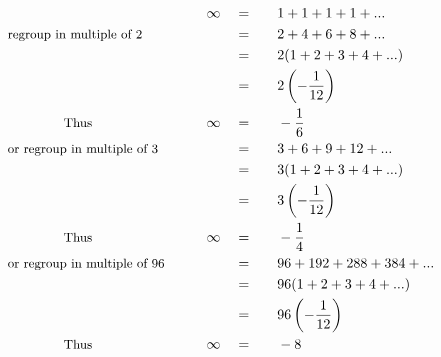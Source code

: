 \begin{alignat*}{5}
&\,&\infty\quad&=\quad&&1+1+1+1+...\\
&\small\text{regroup in multiple of 2}&\,&=&&2+4+6+8+...\\
&\,&\,&=&&2(1+2+3+4+...)\\
&\,&\,&=&&2\left(-\frac{1}{12}\right)\\
&\qquad\qquad\small\text{Thus}&\infty\quad&=&&-\frac{1}{6}\\
&\small\text{or regroup in multiple of 3}&\,&=&&3+6+9+12+...\\
&\,&\,&=&&3(1+2+3+4+...)\\
&\,&\,&=&&3\left(-\frac{1}{12}\right)\\
&\qquad\qquad\small\text{Thus}&\infty\quad&=&&-\frac{1}{4}\\
&\small\text{or regroup in multiple of 96}\normalsize\qquad&\,&=&&96+192+288+384+...\\
&\,&\,&=&&96(1+2+3+4+...)\\
&\,&\,&=&&96\left(-\frac{1}{12}\right)\\
&\qquad\qquad\small\text{Thus}&\infty\quad&=&&-8\\
\end{alignat*}
